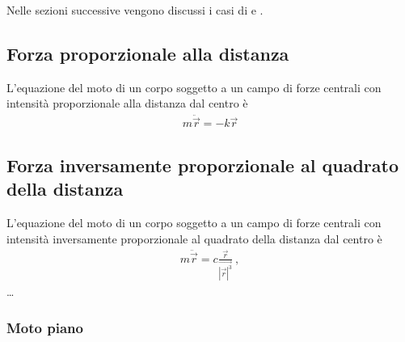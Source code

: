 \documentclass[letterpaper,10pt,italian]{jupyterBook}
\begin{document}
\sphinxAtStartPar
Nelle sezioni successive vengono discussi i casi di {\hyperref[\detokenize{ch/mechanics/dynamics-central:physics-hs-mechanics-dynamics-motion-central-r}]{}} e {\hyperref[\detokenize{ch/mechanics/dynamics-central:physics-hs-mechanics-dynamics-motion-central-r-2}]{}}.


\subsection{Forza proporzionale alla distanza}
\label{\detokenize{ch/mechanics/dynamics-central:forza-proporzionale-alla-distanza}}\label{\detokenize{ch/mechanics/dynamics-central:physics-hs-mechanics-dynamics-motion-central-r}}
\sphinxAtStartPar
L’equazione del moto di un corpo soggetto a un campo di forze centrali con intensità proporzionale alla distanza dal centro è
\begin{equation*}
\begin{split}m \ddot{\vec{r}} = -k \vec{r}\end{split}
\end{equation*}
\sphinxAtStartPar
{}


\subsection{Forza inversamente proporzionale al quadrato della distanza}
\label{\detokenize{ch/mechanics/dynamics-central:forza-inversamente-proporzionale-al-quadrato-della-distanza}}\label{\detokenize{ch/mechanics/dynamics-central:physics-hs-mechanics-dynamics-motion-central-r-2}}
\sphinxAtStartPar
L’equazione del moto di un corpo soggetto a un campo di forze centrali con intensità inversamente proporzionale al quadrato della distanza dal centro è
\begin{equation}\label{equation:ch/mechanics/dynamics-central:eq:central:r-2:eom}
\begin{split}m \ddot{\vec{r}} = c \frac{\vec{r}}{\vec{|\vec{r}|^3}} \ ,\end{split}
\end{equation}
\sphinxAtStartPar
… 

\label{\detokenize{ch/mechanics/dynamics-central:physics-hs-mechanics-dynamics-motion-central-plane}}\subsubsection*{Moto piano}
\end{document}
